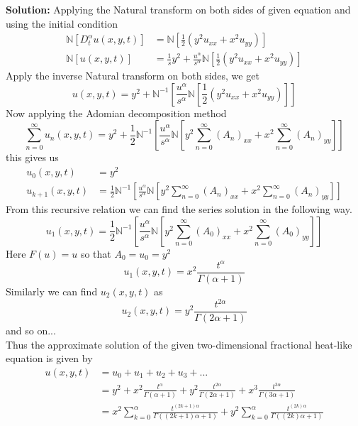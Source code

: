 \textbf{Solution:}
Applying the Natural transform on both sides of given equation and using the initial condition
\begin{align*}
\mathbb{N}[D_{t}^{\alpha}u(x,y,t)]&=\mathbb{N}[\frac{1}{2}(y^{2}u_{xx}+x^{2}u_{yy})]\\
\mathbb{N}[u(x,y,t)]&=\frac{1}{s}y^{2}+\frac{u^{\alpha}}{s^{\alpha}}\mathbb{N}[\frac{1}{2}(y^{2}u_{xx}+x^{2}u_{yy})]
\end{align*}
Apply the inverse Natural transform on both sides, we get
\begin{equation*}
u(x,y,t)=y^{2}+\mathbb{N}^{-1}[\frac{u^{\alpha}}{s^{\alpha}}\mathbb{N}[\frac{1}{2}(y^{2}u_{xx}+x^{2}u_{yy})]]
\end{equation*}
Now applying the Adomian decomposition method
\begin{equation}
\sum_{n=0}^{\infty}u_{n}(x,y,t)=y^{2}+\frac{1}{2}\mathbb{N}^{-1}[\frac{u^{\alpha}}{s^{\alpha}}\mathbb{N}[y^{2}\sum_{n=0}^{\infty}(A_{n})_{xx}+x^{2}\sum_{n=0}^{\infty}(A_{n})_{yy}]]
\end{equation}
this gives us
\begin{align*}
u_{0}(x,y,t)&=y^{2}\\
u_{k+1}(x,y,t)&=\frac{1}{2}\mathbb{N}^{-1}[\frac{u^{\alpha}}{s^{\alpha}}\mathbb{N}[y^{2}\sum_{n=0}^{\infty}(A_{n})_{xx}+x^{2}\sum_{n=0}^{\infty}(A_{n})_{yy}]]
\end{align*}
From this recursive relation we can find the series solution in the following way.
\begin{equation*}
u_{1}(x,y,t)=\frac{1}{2}\mathbb{N}^{-1}[\frac{u^{\alpha}}{s^{\alpha}}\mathbb{N}[y^{2}\sum_{n=0}^{\infty}(A_{0})_{xx}+x^{2}\sum_{n=0}^{\infty}(A_{0})_{yy}]]
\end{equation*}
Here $F(u) = u$ so that \hspace{0.2cm}  $A_{0}=u_{0}=y^{2}$
\begin{equation*}
u_{1}(x,y,t)=x^{2}\frac{t^{\alpha}}{\Gamma{(\alpha+1)}}
\end{equation*}
Similarly we can find $ u_{2}(x,y,t) $ as
\begin{equation*}
u_{2}(x,y,t)=y^{2}\frac{t^{2\alpha}}{\Gamma{(2\alpha+1)}}
\end{equation*}
and so on...\\
Thus the approximate solution of the given two-dimensional fractional heat-like equation is given by
\begin{align*}
u(x,y,t)&=u_{0}+u_{1}+u_{2}+u_{3}+...\\
&=y^{2}+x^{2}\frac{t^{\alpha}}{\Gamma{(\alpha+1)}}+y^{2}\frac{t^{2\alpha}}{\Gamma{(2\alpha+1)}}+x^{3}\frac{t^{3\alpha}}{\Gamma{(3\alpha+1)}}\\
&=x^{2}\sum_{k=0}^{\alpha}\frac{t^{(2k+1)\alpha}}{\Gamma((2k+1)\alpha+1)}+y^{2}\sum_{k=0}^{\alpha}\frac{t^{(2k)\alpha}}{\Gamma((2k)\alpha+1)}
\end{align*}
